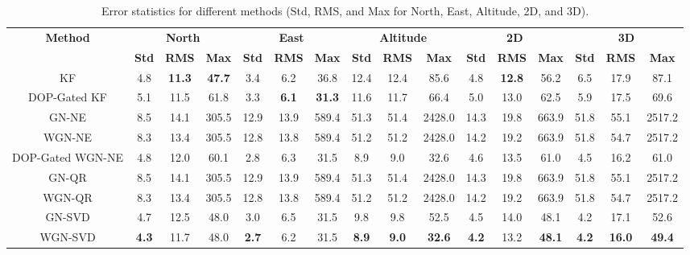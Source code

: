 \documentclass[conference]{IEEEtran}
\begin{document}
\begin{table}[h!]
\centering
\begin{tabular}{|c|c|c|c|c|c|c|c|c|c|c|c|c|c|c|c|}
\hline
\textbf{Method} & \multicolumn{3}{c|}{\textbf{North}} & \multicolumn{3}{c|}{\textbf{East}} & \multicolumn{3}{c|}{\textbf{Altitude}} & \multicolumn{3}{c|}{\textbf{2D}} & \multicolumn{3}{c|}{\textbf{3D}} \\
\cline{2-16}
 & \textbf{Std} & \textbf{RMS} & \textbf{Max} & \textbf{Std} & \textbf{RMS} & \textbf{Max} & \textbf{Std} & \textbf{RMS} & \textbf{Max} & \textbf{Std} & \textbf{RMS} & \textbf{Max} & \textbf{Std} & \textbf{RMS} & \textbf{Max} \\
\hline
KF & 4.8 & \textbf{11.3} & \textbf{47.7} & 3.4 & 6.2 & 36.8 & 12.4 & 12.4 & 85.6 & 4.8 & \textbf{12.8} & 56.2 & 6.5 & 17.9 & 87.1 \\
\hline
DOP-Gated KF & 5.1 & 11.5 & 61.8 & 3.3 & \textbf{6.1} & \textbf{31.3} & 11.6 & 11.7 & 66.4 & 5.0 & 13.0 & 62.5 & 5.9 & 17.5 & 69.6 \\
\hline
GN-NE & 8.5 & 14.1 & 305.5 & 12.9 & 13.9 & 589.4 & 51.3 & 51.4 & 2428.0 & 14.3 & 19.8 & 663.9 & 51.8 & 55.1 & 2517.2 \\
\hline
WGN-NE & 8.3 & 13.4 & 305.5 & 12.8 & 13.8 & 589.4 & 51.2 & 51.2 & 2428.0 & 14.2 & 19.2 & 663.9 & 51.8 & 54.7 & 2517.2 \\
\hline
DOP-Gated WGN-NE & 4.8 & 12.0 & 60.1 & 2.8 & 6.3 & 31.5 & 8.9 & 9.0 & 32.6 & 4.6 & 13.5 & 61.0 & 4.5 & 16.2 & 61.0 \\
\hline
GN-QR & 8.5 & 14.1 & 305.5 & 12.9 & 13.9 & 589.4 & 51.3 & 51.4 & 2428.0 & 14.3 & 19.8 & 663.9 & 51.8 & 55.1 & 2517.2 \\
\hline
WGN-QR & 8.3 & 13.4 & 305.5 & 12.8 & 13.8 & 589.4 & 51.2 & 51.2 & 2428.0 & 14.2 & 19.2 & 663.9 & 51.8 & 54.7 & 2517.2 \\
\hline
GN-SVD & 4.7 & 12.5 & 48.0 & 3.0 & 6.5 & 31.5 & 9.8 & 9.8 & 52.5 & 4.5 & 14.0 & 48.1 & 4.2 & 17.1 & 52.6 \\
\hline
WGN-SVD & \textbf{4.3} & 11.7 & 48.0 & \textbf{2.7} & 6.2 & 31.5 & \textbf{8.9} & \textbf{9.0} & \textbf{32.6} & \textbf{4.2} & 13.2 & \textbf{48.1} & \textbf{4.2} & \textbf{16.0} & \textbf{49.4} \\
\hline
\end{tabular}
\caption{Error statistics for different methods (Std, RMS, and Max for North, East, Altitude, 2D, and 3D).}
\label{tab:error_stats}
\end{table}
\end{document}
